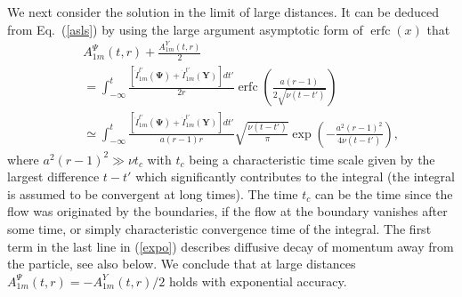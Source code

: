 \documentclass[aps,prx,twocolumn,amsmath,amssymb,amsfonts]{revtex4-2}
\DeclareMathOperator\erfc{erfc}
\begin{document}
We next consider the solution in the limit of large distances. It can be deduced from Eq.~(\ref{asls}) by using the large argument asymptotic form of $\erfc(x)$ that
\begin{eqnarray}
&& A_{1m}^{\Psi}(t, r)+\frac{A_{1m}^{Y}(t, r)}{2} \label{expo} \\
&&=\int_{-\infty}^{t} \!\frac{[\dot{I}_{1m}^{t'}(\bm \Psi) \!+\! \dot{I}_{1m}^{t'}(\bm Y)]dt'}{2r}\erfc\left(\frac{a(r\!-\!1)}{2\sqrt{\nu(t-t')}}\right) \nonumber \\
&&\simeq \int_{-\infty}^{t} \!\!\!\frac{[\dot{I}_{1m}^{t'}(\bm \Psi) \!+\! \dot{I}_{1m}^{t'}(\bm Y)]dt'}{a(r\!-\!1)r}
\sqrt{\frac{\nu(t\!-\!t')}{\pi}}\exp\left(-\frac{a^2(r\!-\!1)^2}{4\nu(t-t')}\right),  \nonumber
\end{eqnarray}
where $a^2(r\!-\!1)^2\!\gg\! \nu t_c$ with $t_c$ being a characteristic time scale given by the largest difference $t-t'$ which significantly contributes to the integral (the integral is assumed to be convergent at long times). The time $t_c$ can be the time since the flow was originated by the boundaries, if the flow at the boundary vanishes after some time, or simply characteristic convergence time of the integral. The first term in the last line in (\ref{expo}) describes diffusive decay of momentum away from the particle, see also below. We conclude that at large distances $A_{1m}^{\Psi}(t, r)=-A_{1m}^{Y}(t, r)/2$ holds with exponential accuracy.
\end{document}
